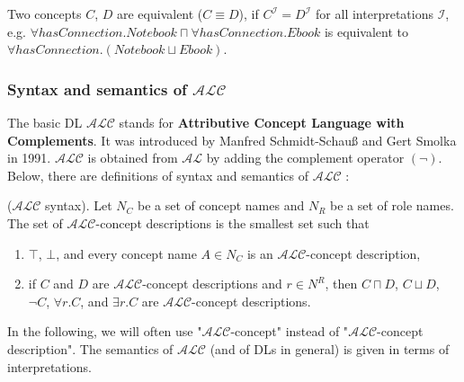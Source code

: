 Two concepts $C$, $D$ are equivalent ($C \equiv D$), if $C^{\mathcal{I}} = D^{\mathcal{I}}$ for all interpretations $\mathcal{I}$, e.g. $\forall hasConnection.Notebook \sqcap \forall hasConnection.Ebook$ is equivalent to $\forall hasConnection.(Notebook \sqcup Ebook)$.

\subsubsection{Syntax and semantics of \texorpdfstring{$\mathcal{ALC}$}{ALC}} %
\label{sss:ALC}

The basic DL $\mathcal{ALC}$ stands for \textbf{Attributive Concept Language with Complements}. It was introduced by Manfred Schmidt-Schauß and Gert Smolka in 1991. $\mathcal{ALC}$ is obtained from $\mathcal{AL}$ by adding the complement operator $(\lnot)$. Below, there are definitions of syntax and semantics of $\mathcal{ALC}$ \cite{HLP08}:

\bigskip

\begin{definition}\label{alcSyntax} ($\mathcal{ALC}$ syntax). Let $N_{C}$ be a set of concept names and $N_{R}$ be a set of role names. The set of $\mathcal{ALC}$-concept descriptions is the smallest set such that

\begin{enumerate}
    \item $\top$, $\bot$, and every concept name $A\in N_{C}$ is an $\mathcal{ALC}$-concept description,
    \item if $C$ and $D$ are $\mathcal{ALC}$-concept descriptions and $r\in N^{R}$, then $C \sqcap D$, $C \sqcup D$, $\lnot C$, $\forall r.C$, and $\exists r.C$ are $\mathcal{ALC}$-concept descriptions.
\end{enumerate}

\noindent In the following, we will often use "$\mathcal{ALC}$-concept" instead of "$\mathcal{ALC}$-concept description". The semantics of $\mathcal{ALC}$ (and of DLs in general) is given in terms of interpretations.
\end{definition}

\medskip

